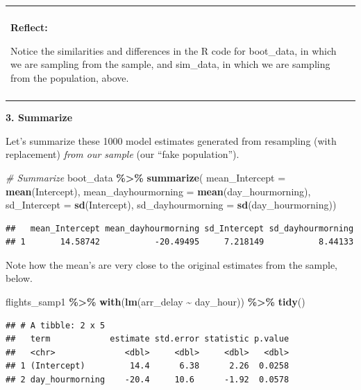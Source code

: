 \documentclass[
]{book}
\newenvironment{Shaded}{\begin{snugshade}}{\end{snugshade}}
\newcommand{\AttributeTok}[1]{\textcolor[rgb]{0.13,0.29,0.53}{#1}}
\newcommand{\CommentTok}[1]{\textcolor[rgb]{0.56,0.35,0.01}{\textit{#1}}}
\newcommand{\FunctionTok}[1]{\textcolor[rgb]{0.13,0.29,0.53}{\textbf{#1}}}
\newcommand{\NormalTok}[1]{#1}
\newcommand{\SpecialCharTok}[1]{\textcolor[rgb]{0.81,0.36,0.00}{\textbf{#1}}}
\newenvironment{reflect}
{
    \begin{center}
    
    \begin{tabular}{|p{0.8\textwidth}|}
    \rowcolor{LightBlue}
    \hline\\
    \rowcolor{LightBlue}
    \textbf{Reflect:}
}
{
    \\\rowcolor{LightBlue}
    \\\hline
    \end{tabular} 
    \end{center}
}
\begin{document}
\begin{reflect}
Notice the similarities and differences in the R code for boot\_data, in
which we are sampling from the sample, and sim\_data, in which we are
sampling from the population, above.
\end{reflect}

\textbf{3. Summarize}

Let's summarize these 1000 model estimates generated from resampling (with replacement) \emph{from our sample} (our ``fake population'').

\begin{Shaded}
\begin{Highlighting}[]
\CommentTok{\# Summarize}
\NormalTok{boot\_data }\SpecialCharTok{\%\textgreater{}\%} 
    \FunctionTok{summarize}\NormalTok{(}
        \AttributeTok{mean\_Intercept =} \FunctionTok{mean}\NormalTok{(Intercept),}
        \AttributeTok{mean\_dayhourmorning =} \FunctionTok{mean}\NormalTok{(day\_hourmorning),}
        \AttributeTok{sd\_Intercept =} \FunctionTok{sd}\NormalTok{(Intercept),}
        \AttributeTok{sd\_dayhourmorning =} \FunctionTok{sd}\NormalTok{(day\_hourmorning))}
\end{Highlighting}
\end{Shaded}

\begin{verbatim}
##   mean_Intercept mean_dayhourmorning sd_Intercept sd_dayhourmorning
## 1       14.58742           -20.49495     7.218149           8.44133
\end{verbatim}

Note how the mean's are very close to the original estimates from the sample, below.

\begin{Shaded}
\begin{Highlighting}[]
\NormalTok{flights\_samp1 }\SpecialCharTok{\%\textgreater{}\%}
    \FunctionTok{with}\NormalTok{(}\FunctionTok{lm}\NormalTok{(arr\_delay }\SpecialCharTok{\textasciitilde{}}\NormalTok{ day\_hour)) }\SpecialCharTok{\%\textgreater{}\%}
    \FunctionTok{tidy}\NormalTok{()}
\end{Highlighting}
\end{Shaded}

\begin{verbatim}
## # A tibble: 2 x 5
##   term            estimate std.error statistic p.value
##   <chr>              <dbl>     <dbl>     <dbl>   <dbl>
## 1 (Intercept)         14.4      6.38      2.26  0.0258
## 2 day_hourmorning    -20.4     10.6      -1.92  0.0578
\end{verbatim}
\end{document}

